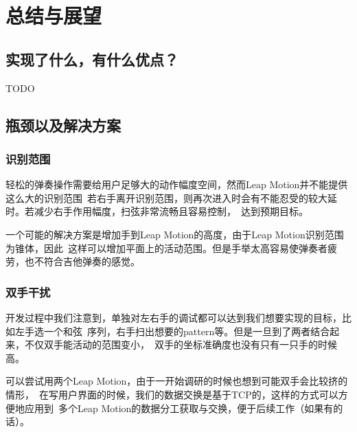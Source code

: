 \chapter{总结与展望}

    \section{实现了什么，有什么优点？}
        TODO

    \section{瓶颈以及解决方案}

        \subsection{识别范围}
        轻松的弹奏操作需要给用户足够大的动作幅度空间，然而Leap Motion并不能提供这么大的识别范围\
        若右手离开识别范围，则再次进入时会有不能忍受的较大延时。若减少右手作用幅度，扫弦非常流畅且容易控制，\
        达到预期目标。

        一个可能的解决方案是增加手到Leap Motion的高度，由于Leap Motion识别范围为锥体，因此\
        这样可以增加平面上的活动范围。但是手举太高容易使弹奏者疲劳，也不符合吉他弹奏的感觉。

        \subsection{双手干扰}
        开发过程中我们注意到，单独对左右手的调试都可以达到我们想要实现的目标，比如左手选一个和弦\
        序列，右手扫出想要的pattern等。但是一旦到了两者结合起来，不仅双手能活动的范围变小，\
        双手的坐标准确度也没有只有一只手的时候高。

        可以尝试用两个Leap Motion，由于一开始调研的时候也想到可能双手会比较挤的情形，\
        在写用户界面的时候，我们的数据交换是基于TCP的，这样的方式可以方便地应用到\
        多个Leap Motion的数据分工获取与交换，便于后续工作（如果有的话）。
